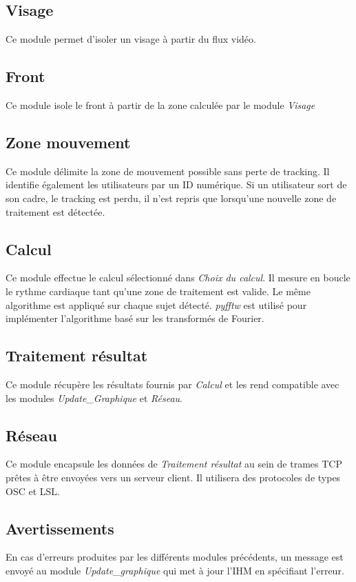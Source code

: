\documentclass[12pt,a4paper]{article}
\begin{document}
\subsection{Visage}
Ce module permet d'isoler un visage à partir du flux vidéo.

\subsection{Front}
Ce module isole le front à partir de la zone calculée par le module \textit{Visage}

\subsection{Zone mouvement}

Ce module délimite la zone de mouvement possible sans perte de tracking. Il identifie également les utilisateurs par un ID numérique. Si un utilisateur sort de son cadre, le tracking est perdu, il n'est repris que lorsqu'une nouvelle zone de traitement est détectée.
\vspace*{-0.5in}
\subsection{Calcul}

Ce module effectue le calcul sélectionné dans \textit{Choix du calcul}. Il mesure en boucle le rythme cardiaque tant qu'une zone de traitement est valide.
Le même algorithme est appliqué sur chaque sujet détecté.\newline
\textit{pyfftw} est utilisé pour implémenter l'algorithme basé sur les transformés de Fourier.

\subsection{Traitement résultat}
Ce module récupère les résultats fournis par \textit{Calcul} et les rend compatible avec les modules \textit{Update\_Graphique} et \textit{Réseau}.

\subsection{Réseau}
Ce module encapsule les données de \textit{Traitement résultat} au sein de trames TCP prêtes à être envoyées vers un serveur client.
Il utilisera des protocoles de types OSC et LSL.

\subsection{Avertissements}
En cas d'erreurs produites par les différents modules précédents, un message est envoyé au module \textit{Update\_graphique} qui met à jour l'IHM en spécifiant l'erreur.
\end{document}

